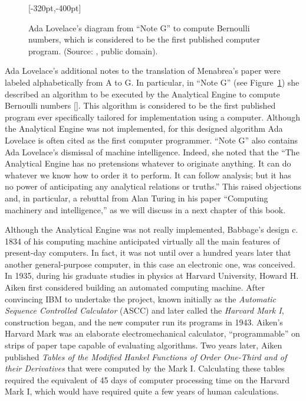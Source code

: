 {{{\begin{figure}[b!]
\hspace*{-50pt}[-320pt,-400pt]
\caption{\label{fig:1.4}Ada Lovelace's diagram from ``Note G'' to compute Bernoulli numbers, which is considered to be the first published computer program. (Source: \citet{chap:01:Menabrea:1843}, public domain).}
\end{figure}

Ada Lovelace's additional notes to the translation of Menabrea's
paper were labeled alphabetically from A to G. In particular, in
``Note G'' (see Figure~\ref{fig:1.4}) she described an algorithm to
be executed by the Analytical Engine to compute Bernoulli
numbers
[\citealt{chap:01:HuskeyandHuskey:1980}]. This algorithm is considered to be the first published program ever specifically tailored for implementation using a computer. Although the Analytical Engine was not implemented, for this designed algorithm Ada Lovelace is often cited as the first computer programmer. ``Note G'' also contains Ada Lovelace's dismissal of machine intelligence. Indeed, she noted that the ``The Analytical Engine has no pretensions whatever to originate anything. It can do whatever we know how to order it to perform. It can follow analysis; but it has no power of anticipating any analytical relations or truths.'' This raised objections and, in particular, a rebuttal from Alan Turing in his paper ``Computing machinery and intelligence,'' as we will discuss in a next chapter of this book.

Although the Analytical Engine was not really implemented, Babbage's design c. 1834 of his computing machine anticipated virtually all the main features of present-day computers. In fact, it was not until over a hundred years later that another general-purpose computer, in this case an electronic one, was conceived. In 1935, during his graduate studies in physics at Harvard University, Howard H. Aiken first considered building an automated computing machine. After convincing IBM to undertake the project, known initially as the \textit{Automatic Sequence Controlled Calculator} (ASCC) and later called the \textit{Harvard Mark I}, construction began, and the new computer run its programs in 1943. Aiken's Harvard Mark was an elaborate electromechanical calculator, ``programmable'' on strips of paper tape capable of evaluating algorithms. Two years later, Aiken published \textit{Tables of the Modified Hankel Functions of Order One-Third and of their Derivatives} that were computed by the Mark I. Calculating these tables required the equivalent of 45 days of computer processing time on the Harvard Mark I, which would have required quite a few years of human calculations.

}}}
